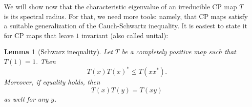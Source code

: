 \documentclass{article}
\newtheorem{lemma}{Lemma}
\begin{document}
We will show now that the characteristic eigenvalue of an irreducible CP map $T$ is its spectral radius. For that, we need more tools: namely, that CP maps satisfy a suitable generalization of the Cauch-Schwartz inequality. It is easiest to state it for CP maps that leave $1$ invariant (also called unital):
\begin{lemma}[Schwarz inequality]\label{lem:Schwarz}
  Let $T$ be a completely positive map such that $T(1)=1$. Then 
  \begin{equation*}
    T(x) T(x)^* \leq T(xx^*).
  \end{equation*}
  Moreover, if equality holds, then 
  \begin{equation*}
    T(x) T(y) = T(xy)
  \end{equation*}
  as well for any $y$. 
\end{lemma}
\end{document}
